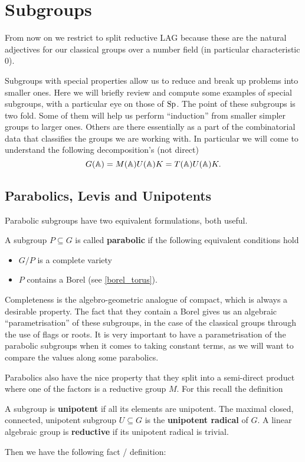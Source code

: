 \section{Subgroups}
From now on we restrict to split reductive LAG because these are the natural adjectives for our classical groups over a number field (in particular characteristic 0).

Subgroups with special properties allow us to reduce and break up problems into smaller ones. Here we will briefly review and compute some examples of special subgroups, with a particular eye on those of \(\operatorname{Sp}\). The point of these subgroups is two fold. Some of them will help us perform ``induction'' from smaller simpler groups to larger ones. Others are there essentially as a part of the combinatorial data that classifies the groups we are working with. In particular we will come to understand the following decomposition's (not direct)
\[G(\A) = M(\A)U(\A) K = T(\A)U(\A)K.\]

\subsection{Parabolics, Levis and Unipotents}
Parabolic subgroups have two equivalent formulations, both useful.
\begin{definition}
    A subgroup \(P\subseteq G\) is called \textbf{parabolic} if the following equivalent conditions hold
    \begin{itemize}
        \item \(G/P\) is a complete variety
        \item \(P\) contains a Borel (see \ref{borel_torus}).
    \end{itemize}
\end{definition}

Completeness is the algebro-geometric analogue of compact, which is always a desirable property. The fact that they contain a Borel gives us an algebraic ``parametrisation'' of these subgroups, in the case of the classical groups through the use of flags or roots. It is very important to have a parametrisation of the parabolic subgroups when it comes to taking constant terms, as we will want to compare the values along some parabolics.

Parabolics also have the nice property that they split into a semi-direct product 
where one of the factors is a reductive group \(M\). For this recall the definition
\begin{definition}\label{unipotent_radical_definition}
    A subgroup is \textbf{unipotent} if all its elements are unipotent.
    The maximal closed, connected, unipotent subgroup \(U\subseteq G\) is the \textbf{unipotent radical} of \(G\). A linear algebraic group is \textbf{reductive} if its unipotent radical is trivial.
\end{definition}
Then we have the following fact / definition:

